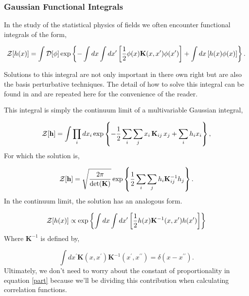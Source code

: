 \subsubsection{Gaussian Functional Integrals}

In the study of the statistical physics of fields we often encounter functional integrals of the form,

\begin{equation}
\mathcal{Z}[h(x)] = \int \mathcal{D}[\phi] \exp\left\lbrace - \int dx \int dx^\prime \left[ \frac{1}{2}\phi(x) \mathbf{K}(x, x^\prime) \phi(x^\prime)\right] +  \int dx \left[h(x) \phi(x)\right]\right\rbrace.
\end{equation}

Solutions to this integral are not only important in there own right but are also the basis perturbative techniques. The detail of how to solve this integral can be found in \cite{Kardar} and are repeated here for the convenience of the reader.

This integral is simply the continuum limit of a multivariable Gaussian integral,

\begin{equation}
\mathcal{Z}[\mathbf{h}] = \int \prod_i dx_i \exp \left\lbrace - \frac{1}{2}\sum_i \sum_j x_i\, \mathbf{K}_{ij}\, x_j  + \sum_i h_i x_i\right\rbrace,
\end{equation}
For which the solution is,

\begin{equation}
\mathcal{Z}[\mathbf{h}] = \sqrt{\frac{2\pi}{\det(\mathbf{K})}} \exp\left\lbrace \frac{1}{2} \sum_i \sum_j h_i \mathbf{K}_{ij}^{-1} h_j\right\rbrace.
\end{equation}
In the continuum limit, the solution has an analogous form.

\begin{equation}\label{part}
\mathcal{Z}[h(x)] \propto \exp\left\lbrace \int dx \int dx^\prime \left[ \frac{1}{2}h(x) \mathbf{K}^{-1}(x, x^\prime) h(x^\prime)\right] \right\rbrace
\end{equation}
Where $\mathbf{K}^{-1}$ is defined by,

\begin{equation}
\int dx^\prime \mathbf{K}(x, x^\prime)\mathbf{K}^{-1}(x^\prime, x^{\prime\prime}) = \delta(x - x^{\prime\prime}).
\end{equation}
Ultimately, we don't need to worry about the constant of proportionality in equation \ref{part} because we'll be dividing this contribution when calculating correlation functions.
